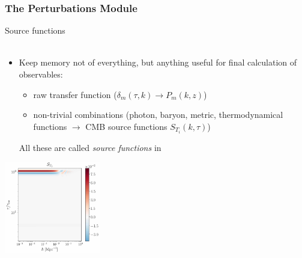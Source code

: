 \begin{frame}[fragile]
\frametitle{The Perturbations Module}

Source functions \\
\mbox{}\\
\begin{itemize}
\item \scriptsize Keep memory not of everything, but anything useful for final calculation of observables: 
\begin{itemize}
\item \scriptsize raw transfer function ($\delta_m(\tau,k) \rightarrow P_m(k,z)$)
\item \scriptsize non-trivial combinations (photon, baryon, metric, thermodynamical functions $\rightarrow$ CMB source functions $S_{T_i}(k,\tau)$) 
\end{itemize}
All these are called {\it source functions} in {\Red \CLASS{}} 
\end{itemize}
{\begin{center}
\includegraphics[height=4cm,angle=0]{Figures/t0_lowres.jpg}
\end{center}}

\end{frame}



